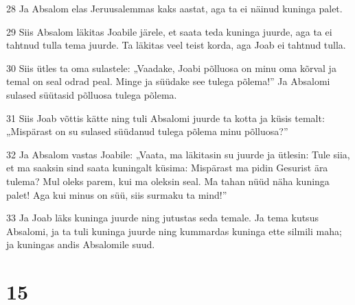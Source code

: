 \par 28 Ja Absalom elas Jeruusalemmas kaks aastat, aga ta ei näinud kuninga palet.
\par 29 Siis Absalom läkitas Joabile järele, et saata teda kuninga juurde, aga ta ei tahtnud tulla tema juurde. Ta läkitas veel teist korda, aga Joab ei tahtnud tulla.
\par 30 Siis ütles ta oma sulastele: „Vaadake, Joabi põlluosa on minu oma kõrval ja temal on seal odrad peal. Minge ja süüdake see tulega põlema!” Ja Absalomi sulased süütasid põlluosa tulega põlema.
\par 31 Siis Joab võttis kätte ning tuli Absalomi juurde ta kotta ja küsis temalt: „Mispärast on su sulased süüdanud tulega põlema minu põlluosa?”
\par 32 Ja Absalom vastas Joabile: „Vaata, ma läkitasin su juurde ja ütlesin: Tule siia, et ma saaksin sind saata kuningalt küsima: Mispärast ma pidin Gesurist ära tulema? Mul oleks parem, kui ma oleksin seal. Ma tahan nüüd näha kuninga palet! Aga kui minus on süü, siis surmaku ta mind!”
\par 33 Ja Joab läks kuninga juurde ning jutustas seda temale. Ja tema kutsus Absalomi, ja ta tuli kuninga juurde ning kummardas kuninga ette silmili maha; ja kuningas andis Absalomile suud.

\chapter{15}

